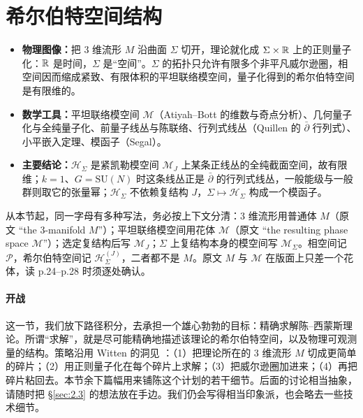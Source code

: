 \section{希尔伯特空间结构}\label{sec:4}

\begin{keytakeaways}
\begin{itemize}[leftmargin=1.4em,itemsep=2pt,topsep=2pt]
  \item \textbf{物理图像：}把 3 维流形 $M$ 沿曲面 $\Sigma$ 切开，理论就化成 $\Sigma\times\mathbb{R}$ 上的正则量子化：$\mathbb{R}$ 是时间，$\Sigma$ 是“空间”。$\Sigma$ 的拓扑只允许有限多个非平凡威尔逊圈，相空间因而缩成紧致、有限体积的平坦联络模空间，量子化得到的希尔伯特空间是有限维的。
  \item \textbf{数学工具：}平坦联络模空间 $\mathcal{M}$（Atiyah--Bott 的维数与奇点分析）、几何量子化与全纯量子化、前量子线丛与陈联络、行列式线丛（Quillen 的 $\bar\partial$ 行列式）、小平嵌入定理、模函子（Segal）。
  \item \textbf{主要结论：}$\mathcal{H}_\Sigma$ 是紧凯勒模空间 $\mathcal{M}_J$ 上某条正线丛的全纯截面空间，故有限维；$k=1$、$G=\mathrm{SU}(N)$ 时这条线丛正是 $\bar\partial$ 的行列式线丛，一般能级与一般群则取它的张量幂；$\mathcal{H}_\Sigma$ 不依赖复结构 $J$，$\Sigma\mapsto\mathcal{H}_\Sigma$ 构成一个模函子。
\end{itemize}
\end{keytakeaways}

\begin{yizhu}[易错点]
从本节起，同一字母有多种写法，务必按上下文分清：3 维流形用普通体 $M$（原文 “the 3-manifold $M$”）；平坦联络模空间用花体 $\mathcal{M}$（原文 “the resulting phase space $\mathcal{M}$”）；选定复结构后写 $\mathcal{M}_J$；$\Sigma$ 上复结构本身的模空间写 $\mathcal{M}_\Sigma$。相空间记 $\mathcal{P}$，希尔伯特空间记 $\mathcal{H}_\Sigma^{(J)}$，二者都不是 $M$。原文 $M$ 与 $\mathcal{M}$ 在版面上只差一个花体，读 p.24--p.28 时须逐处确认。
\end{yizhu}

\paragraph{开战}
这一节，我们放下路径积分，去承担一个雄心勃勃的目标：精确求解陈--西蒙斯理论。所谓“求解”，就是尽可能精确地描述该理论的希尔伯特空间，以及物理可观测量的结构。策略沿用 Witten 的洞见 \cite{witten1989}：（1）把理论所在的 3 维流形 $M$ 切成更简单的碎片；（2）用正则量子化在每个碎片上求解；（3）把威尔逊圈加进来；（4）再把碎片粘回去。本节余下篇幅用来铺陈这个计划的若干细节。后面的讨论相当抽象，请随时把 \S\ref{sec:2.3} 的想法放在手边。我们仍会写得相当印象派，也会略去一些技术细节。

